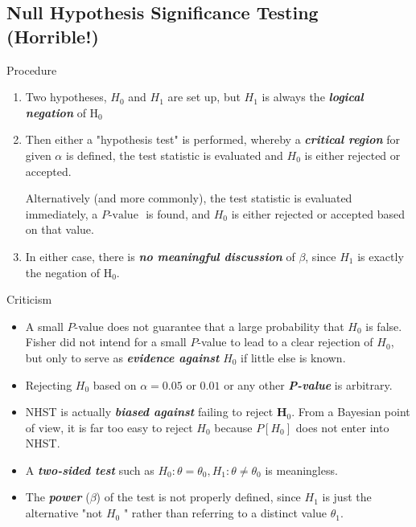 \documentclass{beamer}
\newcommand{\bb}[1]{\textcolor{antiquefuchsia}{\textbf{\textit{#1}}}}
\begin{document}
\subsection{Null Hypothesis Significance Testing (Horrible!)}
\begin{frame}{Procedure}
\begin{enumerate}
\item Two hypotheses, $H_{0}$ and $H_{1}$ are set up, but $H_{1}$ is always the \bb{logical negation} of $\mathrm{H}_{0}$

\item Then either a "hypothesis test" is performed, whereby a \bb{critical region} for given $\alpha$ is defined, the test statistic is evaluated and $H_{0}$ is either rejected or accepted.

Alternatively (and more commonly), the test statistic is evaluated immediately, a $P{\text {-value }}$ is found, and $H_{0}$ is either rejected or accepted based on that value.

\item In either case, there is \bb{no meaningful discussion} of $\beta$, since $H_{1}$ is exactly the negation of $\mathrm{H}_{0}$.
\end{enumerate}
\end{frame}

\begin{frame}{Criticism}
\begin{itemize}
\item A small $P$-value does not guarantee that a large probability that $H_{0}$ is false. Fisher did not intend for a small $P$-value to lead to a clear rejection of $H_{0}$, but only to serve as \bb{evidence against} $H_{0}$ if little else is known.
\item Rejecting $H_{0}$ based on $\alpha=0.05$ or $0.01$ or any other \bb{P-value} is arbitrary.
\item NHST is actually \bb{biased against} failing to reject $\boldsymbol{H}_{0}$. From a Bayesian point of view, it is far too easy to reject $H_{0}$ because $P\left[H_{0}\right]$ does not enter into NHST.
\item A \bb{two-sided test} such as $H_{0}: \theta=\theta_{0}, H_{1}: \theta \neq \theta_{0}$ is meaningless.
\item The \bb{power} ($\beta$) of the test is not properly defined, since $H_{1}$ is just the alternative "not $H_{0}$ " rather than referring to a distinct value $\theta_{1}$.
\end{itemize}
\end{frame}
\end{document}
